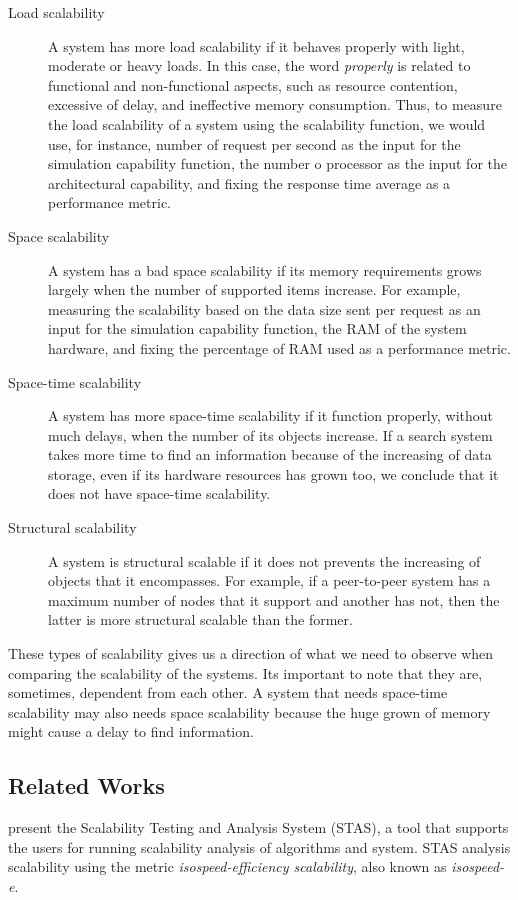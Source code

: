 \begin{description}
\item[Load scalability] A system has more load scalability if it behaves properly with light, moderate or heavy loads. In this case, the word \emph{properly} is related to functional and non-functional aspects, such as resource contention, excessive of delay, and ineffective memory consumption. Thus, to measure the load scalability of a system using the scalability function, we would use, for instance,  number of request per second as the input for the simulation capability function, the number o processor as the input for the architectural capability, and fixing the response time average as a performance metric.
\item[Space scalability]  A system has a bad space scalability if its memory requirements grows largely when the number of supported items increase. For example, measuring the scalability based on the data size sent per request as an input for the simulation capability function, the RAM of the system hardware, and fixing the percentage of RAM used as a performance metric.
\item[Space-time scalability] A system has more space-time scalability if it function properly, without much delays, when the number of its objects increase. If a search system takes more time to find an information because of the increasing of data storage, even if its hardware resources has grown too, we conclude that it does not have space-time scalability.
\item[Structural scalability] A system is structural scalable if it does not prevents the increasing of objects that it encompasses. For example, if a peer-to-peer system has a maximum number of nodes that it support and another has not, then the latter is more structural scalable than the former.
\end{description}

These types of scalability gives us a direction of what we need to observe when comparing the scalability of the systems. Its important to note that they are, sometimes, dependent from each other. A system that needs space-time scalability may also needs space scalability because the huge grown of memory might cause a delay to find information.

\subsection{Related Works}

\cite{STAS} present the Scalability Testing and Analysis System (STAS), a tool that supports the users for running scalability analysis of algorithms and system. STAS analysis scalability using the metric \emph{isospeed-efficiency scalability}, also known as \emph{isospeed-e}. 

